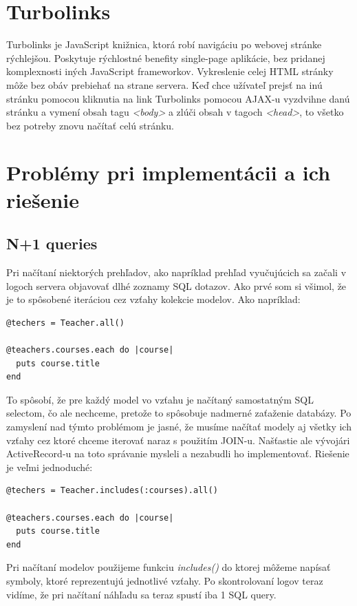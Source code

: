 \clearpage
\section{Turbolinks}

Turbolinks je JavaScript knižnica, ktorá robí navigáciu po webovej stránke rýchlejšou. Poskytuje rýchlostné benefity single-page aplikácie, bez pridanej komplexnosti iných JavaScript frameworkov. Vykreslenie celej HTML stránky môže bez obáv prebiehať na strane servera. Keď chce užívateľ prejsť na inú stránku pomocou kliknutia na link Turbolinks pomocou AJAX-u vyzdvihne danú stránku a vymení obsah tagu \emph{<body>} a zlúči obsah v tagoch \emph{<head>}, to všetko bez potreby znovu načítať celú stránku. \citep{web:turbolinks}

\section{Problémy pri implementácii a ich riešenie}
\subsection{N+1 queries}

Pri načítaní niektorých prehľadov, ako napríklad prehľad vyučujúcich sa začali v logoch servera objavovať dlhé zoznamy SQL dotazov. Ako prvé som si všimol, že je to spôsobené iteráciou cez vzťahy kolekcie modelov. Ako napríklad:

\begin{verbatim}
@techers = Teacher.all()

@teachers.courses.each do |course|
  puts course.title
end
\end{verbatim}

To spôsobí, že pre každý model vo vzťahu je načítaný samostatným SQL selectom, čo ale nechceme, pretože to spôsobuje nadmerné zaťaženie databázy. Po zamyslení nad týmto problémom je jasné, že musíme načítať modely aj všetky ich vzťahy cez ktoré chceme iterovať naraz s použitím JOIN-u.
Našťastie ale vývojári ActiveRecord-u na toto správanie mysleli a nezabudli ho implementovať. Riešenie je veľmi jednoduché:

\begin{verbatim}
@techers = Teacher.includes(:courses).all()

@teachers.courses.each do |course|
  puts course.title
end
\end{verbatim}

Pri načítaní modelov použijeme funkciu \emph{includes()} do ktorej môžeme napísať symboly, ktoré reprezentujú jednotlivé vzťahy. Po skontrolovaní logov teraz vidíme, že pri načítaní náhľadu sa teraz spustí iba 1 SQL query.

